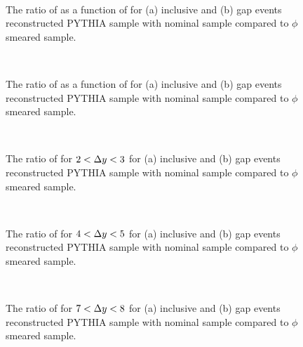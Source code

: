\begin{figure}
\centering
\mbox{
              \quad
              \quad
                              }
\caption[]{
The ratio of \mean{\cosdphi{}} as a function of \dy{} for (a) inclusive and (b) gap events reconstructed PYTHIA sample with nominal sample compared to $\phi$ smeared sample.
\label{GBJ2:ResoPhi:cos}}
\end{figure}

\begin{figure}
\centering
\mbox{
              \quad
              \quad
                              }
\caption[]{
The ratio of \mean{\costwodphi{}} as a function of \dy{} for (a) inclusive and (b) gap events reconstructed PYTHIA sample with nominal sample compared to $\phi$ smeared sample.
\label{GBJ2:ResoPhi:cos2}}
\end{figure}


\begin{figure}
\centering
\mbox{
              \quad
              \quad
                              }
\caption[]{
The ratio of \dphiDist{} for $2<\mbox{$\Delta y$}{}<3$ for (a) inclusive and (b) gap events reconstructed PYTHIA sample with nominal sample compared to $\phi$ smeared sample.
\label{GBJ2:ResoPhi:dphi23}}
\end{figure}


\begin{figure}
\centering
\mbox{
              \quad
              \quad
                              }
\caption[]{
The ratio of \dphiDist{} for $4<\mbox{$\Delta y$}{}<5$ for (a) inclusive and (b) gap events reconstructed PYTHIA sample with nominal sample compared to $\phi$ smeared sample.
\label{GBJ2:ResoPhi:dphi45}}
\end{figure}



\begin{figure}
\centering
\mbox{
              \quad
              \quad
                              }
\caption[]{
The ratio of \dphiDist{} for $7<\mbox{$\Delta y$}{}<8$ for (a) inclusive and (b) gap events reconstructed PYTHIA sample with nominal sample compared to $\phi$ smeared sample.
\label{GBJ2:ResoPhi:dphi78}}
\end{figure}


